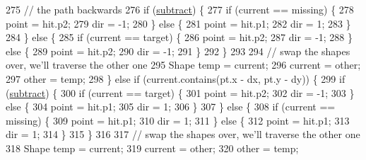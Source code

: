 \begin{DoxyCode}
275                     \textcolor{comment}{// the path backwards}
276                     \textcolor{keywordflow}{if} (\mbox{\hyperlink{classorg_1_1newdawn_1_1slick_1_1geom_1_1_geom_util_a4c08d4344876c0f7225933783a26a56a}{subtract}}) \{
277                         \textcolor{keywordflow}{if} (current == missing) \{
278                             point = hit.p2;
279                             dir = -1;
280                         \} \textcolor{keywordflow}{else} \{
281                             point = hit.p1;
282                             dir = 1;
283                         \}
284                     \} \textcolor{keywordflow}{else} \{
285                         \textcolor{keywordflow}{if} (current == target) \{
286                             point = hit.p2;
287                             dir = -1;
288                         \} \textcolor{keywordflow}{else} \{
289                             point = hit.p2;
290                             dir = -1;
291                         \}
292                     \}
293                     
294                     \textcolor{comment}{// swap the shapes over, we'll traverse the other one }
295                     Shape temp = current;
296                     current = other;
297                     other = temp;
298                 \} \textcolor{keywordflow}{else} \textcolor{keywordflow}{if} (current.contains(pt.x - dx, pt.y - dy)) \{
299                     \textcolor{keywordflow}{if} (\mbox{\hyperlink{classorg_1_1newdawn_1_1slick_1_1geom_1_1_geom_util_a4c08d4344876c0f7225933783a26a56a}{subtract}}) \{
300                         \textcolor{keywordflow}{if} (current == target) \{
301                             point = hit.p2;
302                             dir = -1;
303                         \} \textcolor{keywordflow}{else} \{
304                             point = hit.p1;
305                             dir = 1;
306                         \}
307                     \} \textcolor{keywordflow}{else} \{
308                         \textcolor{keywordflow}{if} (current == missing) \{
309                             point = hit.p1;
310                             dir = 1;
311                         \} \textcolor{keywordflow}{else} \{
312                             point = hit.p1;
313                             dir = 1;
314                         \}
315                     \}
316                     
317                     \textcolor{comment}{// swap the shapes over, we'll traverse the other one }
318                     Shape temp = current;
319                     current = other;
320                     other = temp;

\end{DoxyCode}
